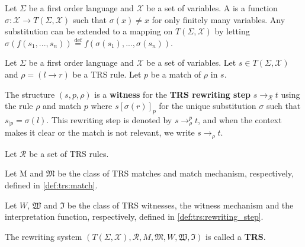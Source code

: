   \begin{definition}[Substitution]
    Let $\Sigma$ be a first order language and $\mathcal{X}$ be a set of variables.
    A  is a function $\sigma : \mathcal{X} \rightarrow T(\Sigma, \mathcal{X})$ such that $\sigma(x) \not = x$ for only finitely many variables. Any substitution can be extended to a mapping on $T(\Sigma,\mathcal{X})$ by letting $\sigma(f(s_1,...,s_n)) \overset{\operatorname{def}}{=}f(\sigma(s_1),...,\sigma(s_n))$.
  \end{definition}

   
  \begin{definition}
    \label{def:trs:rewriting_step}
    Let $\Sigma$ be a first order language and $\mathcal{X}$ be a set of variables. Let $s \in T(\Sigma, \mathcal{X})$ and $\rho = (l \to r)$ be a TRS rule. Let $p$ be a match of $\rho$ in $s$.

    The structure $(s, p, \rho)$ is a \textbf{witness} for the \textbf{TRS rewriting step} $s \to_\mathcal{R} t$ using the rule $\rho$ and match $p$
     where $s[\sigma(r)]_p$ for the unique substitution $\sigma$ such that $s_{|p} = \sigma(l)$. This rewriting step is denoted by $s \to^p_\rho t$, and when the context makes it clear or the match is not relevant, we write $s \to_\rho t$.
  \end{definition}
  
  \begin{definition}
    Let $\mathcal{R}$ be a set of TRS rules. 

    Let M and $\mathfrak{M}$ be the class of TRS matches and match mechanism, respectively, defined in \autoref{def:trs:match}. 

    Let $W$, $\mathfrak{W}$ and $\mathfrak{I}$ be the class of TRS witnesses, the witness mechanism and the interpretation function, respectively, defined in \autoref{def:trs:rewriting_step}.

    The rewriting system $(T(\Sigma,\mathcal{X}), \mathcal{R}, M, \mathfrak{M}, W, \mathfrak{W}, \mathfrak{I})$ is called a \textbf{TRS}.
  \end{definition}

